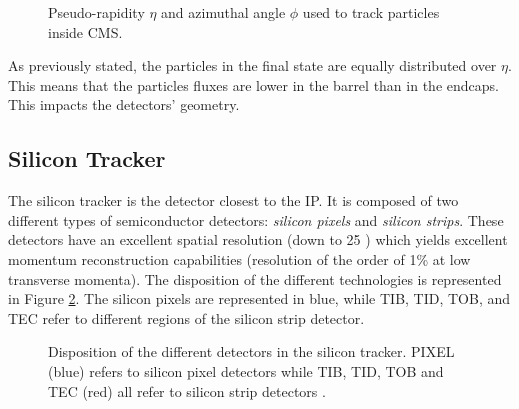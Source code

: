 			\begin{figure}[h!]
				\centering
				\caption{Pseudo-rapidity $ \eta $ and azimuthal angle $ \phi $ used to track particles inside CMS.}
				\label{fig:lhc_and_cms__cms_coordinates}
			\end{figure}

			As previously stated, the particles in the final state are equally distributed over $ \eta $. This means that the particles fluxes are lower in the barrel than in the endcaps. This impacts the detectors' geometry.

		\subsection{Silicon Tracker}
		\label{sec:lhc_and_cms__tracker}

			The silicon tracker is the detector closest to the IP. It is composed of two different types of semiconductor detectors: \emph{silicon pixels} and \emph{silicon strips}. These detectors have an excellent spatial resolution (down to 25 \um{}) which yields excellent momentum reconstruction capabilities (resolution of the order of 1\% at low transverse momenta). The disposition of the different technologies is represented in Figure \ref{fig:lhc_and_cms__cms_tracker}. The silicon pixels are represented in blue, while TIB, TID, TOB, and TEC refer to different regions of the silicon strip detector. \\

			\begin{figure}[h!]
				\centering
				\caption{Disposition of the different detectors in the silicon tracker. PIXEL (blue) refers to silicon pixel detectors while TIB, TID, TOB and TEC (red) all refer to silicon strip detectors \Cite{CMS_at_LHC}.}
				\label{fig:lhc_and_cms__cms_tracker}
			\end{figure}

